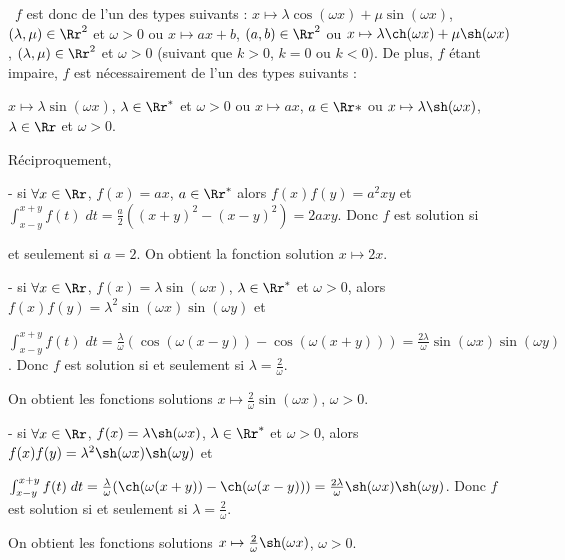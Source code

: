 {{\textbullet~$f$ est donc de l'un des types suivants : $x\mapsto\lambda\cos(\omega x)+\mu\sin(\omega x)$, $(\lambda,\mu)\in\Rr^2$ et $\omega>0$ ou $x\mapsto ax+b$, $(a,b)\in\Rr^2$ ou $x\mapsto \lambda\ch(\omega x)+\mu\sh(\omega x)$, $(\lambda,\mu)\in\Rr^2$ et $\omega>0$ (suivant que $k>0$, $k=0$ ou $k<0$). De plus, $f$ étant impaire, $f$ est nécessairement de l'un des types suivants :

\begin{center}
$x\mapsto\lambda\sin(\omega x)$, $\lambda\in\Rr^*$ et $\omega>0$ ou $x\mapsto ax$, $a\in\Rr*$ ou $x\mapsto \lambda\sh(\omega x)$, $\lambda\in\Rr$ et $\omega>0$.
\end{center}

Réciproquement,

- si $\forall x\in\Rr$, $f(x)=ax$, $a\in\Rr^*$ alors $f(x)f(y)=a^2xy$ et $\int_{x-y}^{x+y}f(t)\;dt= \frac{a}{2}((x+y)^2-(x-y)^2)=2axy$. Donc $f$ est solution si

et seulement si $a=2$. On obtient la fonction solution $x\mapsto2x$.

- si $\forall x\in\Rr$, $f(x)=\lambda\sin(\omega x)$, $\lambda\in\Rr^*$ et $\omega>0$, alors $f(x)f(y)=\lambda^2\sin(\omega x)\sin(\omega y)$ et 

$\int_{x-y}^{x+y}f(t)\;dt= \frac{\lambda}{\omega}(\cos(\omega(x-y))-\cos(\omega(x+y)))= \frac{2\lambda}{\omega}\sin(\omega x)\sin(\omega y)$. Donc $f$ est solution si et seulement si $\lambda= \frac{2}{\omega}$.

On obtient les fonctions solutions $x\mapsto \frac{2}{\omega}\sin(\omega x)$, $\omega>0$.

- si $\forall x\in\Rr$, $f(x)=\lambda\sh(\omega x)$, $\lambda\in\Rr^*$ et $\omega>0$, alors $f(x)f(y)=\lambda^2\sh(\omega x)\sh(\omega y)$ et 

$\int_{x-y}^{x+y}f(t)\;dt= \frac{\lambda}{\omega}(\ch(\omega(x+y))-\ch(\omega(x-y)))= \frac{2\lambda}{\omega}\sh(\omega x)\sh(\omega y)$. Donc $f$ est solution si et seulement si $\lambda= \frac{2}{\omega}$.

On obtient les fonctions solutions $x\mapsto \frac{2}{\omega}\sh(\omega x)$, $\omega>0$.
}
}
